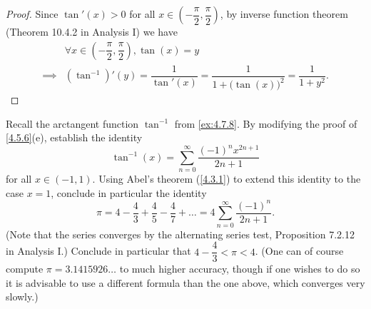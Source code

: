 \begin{proof}
  Since \(\tan'(x) > 0\) for all \(x \in (-\dfrac{\pi}{2}, \dfrac{\pi}{2})\), by inverse function theorem (Theorem 10.4.2 in Analysis I) we have
  \begin{align*}
             & \forall x \in (-\dfrac{\pi}{2}, \dfrac{\pi}{2}), \tan(x) = y                                     \\
    \implies & (\tan^{-1})'(y) = \dfrac{1}{\tan'(x)} = \dfrac{1}{1 + \big(\tan(x)\big)^2} = \dfrac{1}{1 + y^2}.
  \end{align*}
\end{proof}

\begin{ex}\label{ex:4.7.9}
  Recall the arctangent function \(\tan^{-1}\) from \cref{ex:4.7.8}.
  By modifying the proof of \cref{4.5.6}(e), establish the identity
  \[
    \tan^{-1}(x) = \sum_{n = 0}^\infty \dfrac{(-1)^n x^{2n + 1}}{2n + 1}
  \]
  for all \(x \in (-1, 1)\).
  Using Abel's theorem (\cref{4.3.1}) to extend this identity to the case \(x = 1\), conclude in particular the identity
  \[
    \pi = 4 - \dfrac{4}{3} + \dfrac{4}{5} - \dfrac{4}{7} + \dots = 4 \sum_{n = 0}^\infty \dfrac{(-1)^n}{2n + 1}.
  \]
  (Note that the series converges by the alternating series test, Proposition 7.2.12 in Analysis I.)
  Conclude in particular that \(4 - \dfrac{4}{3} < \pi < 4\).
  (One can of course compute \(\pi = 3.1415926 \dots\) to much higher accuracy, though if one wishes to do so it is advisable to use a different formula than the one above, which converges very slowly.)
\end{ex}

